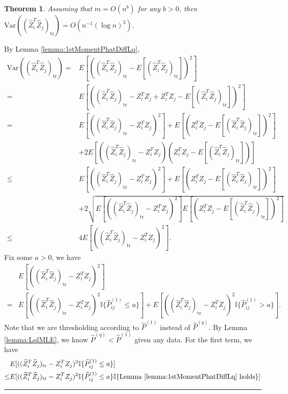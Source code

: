 \documentclass[a4paper]{article}
\newenvironment{proof}{{\bf Proof:  }}{\hfill\rule{2mm}{2mm}}
\newtheorem{theorem}[fact]{Theorem}
\renewcommand{\hat}{\widehat}
\begin{document}
\begin{theorem}
\label{thm:VarASELqproof}
Assuming that $m = O(n^b)$ for any $b > 0$, then $\mathrm{Var}((\hat{Z}_i^T \hat{Z}_j)_{\mathrm{tr}}) = O(n^{-1} (\log n)^3)$.
\end{theorem}
\begin{proof}
By Lemma \ref{lemma:1stMomentPhatDiffLq},
\begin{align*}
	\mathrm{Var}((\hat{Z}_i^T \hat{Z}_j)_{\mathrm{tr}})
    = & E[((\hat{Z}_i^T \hat{Z}_j)_{\mathrm{tr}} - E[(\hat{Z}_i^T \hat{Z}_j)_{\mathrm{tr}}])^2] \\
    = & E[((\hat{Z}_i^T \hat{Z}_j)_{\mathrm{tr}} - Z_i^T Z_j + Z_i^T Z_j - E[(\hat{Z}_i^T \hat{Z}_j)_{\mathrm{tr}}])^2] \\
    = & E[((\hat{Z}_i^T \hat{Z}_j)_{\mathrm{tr}} - Z_i^T Z_j)^2] + E[(Z_i^T Z_j - E[(\hat{Z}_i^T \hat{Z}_j)_{\mathrm{tr}}])^2] \\ 
    & + 2E[((\hat{Z}_i^T \hat{Z}_j)_{\mathrm{tr}} - Z_i^T Z_j)(Z_i^T Z_j - E[(\hat{Z}_i^T \hat{Z}_j)_{\mathrm{tr}}])] \\
    \le & E[((\hat{Z}_i^T \hat{Z}_j)_{\mathrm{tr}} - Z_i^T Z_j)^2] + E[(Z_i^T Z_j - E[(\hat{Z}_i^T \hat{Z}_j)_{\mathrm{tr}}])^2] \\ 
    & + 2\sqrt{E[((\hat{Z}_i^T \hat{Z}_j)_{\mathrm{tr}} - Z_i^T Z_j)^2] E[(Z_i^T Z_j - E[(\hat{Z}_i^T \hat{Z}_j)_{\mathrm{tr}}])^2]} \\
    \le & 4 E[((\hat{Z}_i^T \hat{Z}_j)_{\mathrm{tr}} - Z_i^T Z_j)^2].
\end{align*}
Fix some $a > 0$, we have
\begin{align*}
	& E[((\hat{Z}_i^T \hat{Z}_j)_{\mathrm{tr}} - Z_i^T Z_j)^2] \\
	= & E[((\hat{Z}_i^T \hat{Z}_j)_{\mathrm{tr}} - Z_i^T Z_j)^2 \mathbb{I}\{\hat{P}^{(1)}_{ij} \le a\}]
	+ E[((\hat{Z}_i^T \hat{Z}_j)_{\mathrm{tr}} - Z_i^T Z_j)^2 \mathbb{I}\{\hat{P}^{(1)}_{ij} > a\}].
\end{align*}
Note that we are thresholding according to $\hat{P}^{(1)}$ instead of $\hat{P}^{(q)}$. By Lemma \ref{lemma:LqlMLE}, we know $\hat{P}^{(q)} < \hat{P}^{(1)}$ given any data.
For the first term, we have
\begin{align*}
	& E[((\hat{Z}_i^T \hat{Z}_j)_{\mathrm{tr}} - Z_i^T Z_j)^2 \mathbb{I}\{\hat{P}^{(1)}_{ij} \le a\}] \\
	\le & E[((\hat{Z}_i^T \hat{Z}_j)_{\mathrm{tr}} - Z_i^T Z_j)^2 \mathbb{I}\{\hat{P}^{(1)}_{ij} \le a\} \mathbb{I}\{\mathrm{Lemma\ } \ref{lemma:1stMomentPhatDiffLq} \mathrm{\ holds}\}] \\

\end{align*}
\end{proof}
\end{document}
